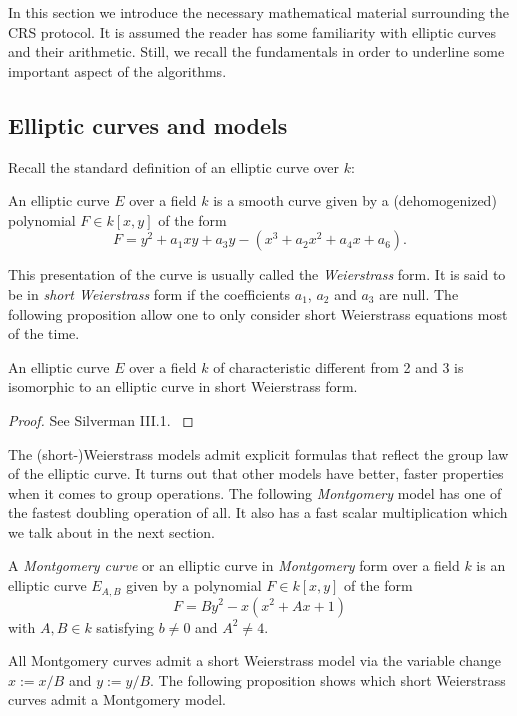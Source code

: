 \documentclass[../main/main.tex]{subfiles}
\begin{document}
In this section we introduce the necessary mathematical material surrounding the CRS protocol.
It is assumed the reader has some familiarity with elliptic curves and their arithmetic.
Still, we recall the fundamentals in order to underline some important aspect of the algorithms.


\subsection{Elliptic curves and models}
Recall the standard definition of an elliptic curve over $k$:
\begin{definition}
	An elliptic curve $E$ over a field $k$ is a smooth curve given by a (dehomogenized) polynomial $F\in k[x,y]$ of the form
	\[
		F = y^2 + a_1xy + a_3y - (x^3 +a_2 x^2 + a_4 x + a_6).
	\]
\end{definition}
This presentation of the curve is usually called the \textit{Weierstrass} form.
It is said to be in \textit{short Weierstrass} form if the coefficients $a_1$, $a_2$ and $a_3$ are null.
The following proposition allow one to only consider short Weierstrass equations most of the time.
\begin{proposition}
	An elliptic curve $E$ over a field $k$ of characteristic different from 2 and 3 is isomorphic to an elliptic curve in short Weierstrass form.
\end{proposition}
\begin{proof}
	See Silverman III.1. \cite{silver}
\end{proof}
The (short-)Weierstrass models admit explicit formulas that reflect the group law of the elliptic curve.
It turns out that other models have better, faster properties when it comes to group operations.
The following \textit{Montgomery} model has one of the fastest doubling operation of all.
It also has a fast scalar multiplication which we talk about in the next section.
\begin{definition}
	A \textit{Montgomery curve} or an elliptic curve in \textit{Montgomery} form over a field $k$ is an elliptic curve $E_{A, B}$ given by a polynomial $F\in k[x, y]$ of the form
	\[
		F = By^2 - x(x^2+Ax + 1)
	\]
	with $A, B\in k$ satisfying $b\neq 0$ and $A^2\neq 4$.
\end{definition}
All Montgomery curves admit a short Weierstrass model via the variable change $x := x/B$ and $y := y/B$.
The following proposition shows which short Weierstrass curves admit a Montgomery model.
\end{document}
